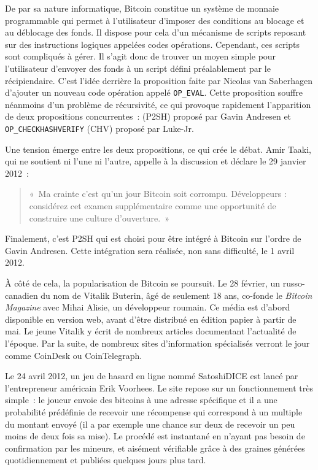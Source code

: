 De par sa nature informatique, Bitcoin constitue un système de monnaie programmable qui permet à l'utilisateur d'imposer des conditions au blocage et au déblocage des fonds. Il dispose pour cela d'un mécanisme de scripts reposant sur des instructions logiques appelées codes opérations. Cependant, ces scripts sont compliqués à gérer. Il s'agit donc de trouver un moyen simple pour l'utilisateur d'envoyer des fonds à un script défini préalablement par le récipiendaire. C'est l'idée derrière la proposition faite par Nicolas van Saberhagen d'ajouter un nouveau code opération appelé \verb?OP_EVAL?. Cette proposition souffre néanmoins d'un problème de récursivité, ce qui provoque rapidement l'apparition de deux propositions concurrentes~:  (P2SH) proposé par Gavin Andresen et \verb?OP_CHECKHASHVERIFY? (CHV) proposé par Luke-Jr.

Une tension émerge entre les deux propositions, ce qui crée le débat. Amir Taaki, qui ne soutient ni l'une ni l'autre, appelle à la discussion et déclare le 29 janvier 2012~:

\begin{quote}
«~Ma crainte c'est qu'un jour Bitcoin soit corrompu. Développeurs : considérez cet examen supplémentaire comme une opportunité de construire une culture d'ouverture.~»
\end{quote} 

Finalement, c'est P2SH qui est choisi pour être intégré à Bitcoin sur l'ordre de Gavin Andresen. Cette intégration sera réalisée, non sans difficulté, le 1\ier{} avril 2012.


À côté de cela, la popularisation de Bitcoin se poursuit. Le 28 février, un russo-canadien du nom de Vitalik Buterin, âgé de seulement 18 ans, co-fonde le \emph{Bitcoin Magazine} avec Mihai Alisie, un développeur roumain. Ce média est d'abord disponible en version web, avant d'être distribué en édition papier à partir de mai. Le jeune Vitalik y écrit de nombreux articles documentant l'actualité de l'époque. Par la suite, de nombreux sites d'information spécialisés verront le jour comme CoinDesk ou CoinTelegraph.

Le 24 avril 2012, un jeu de hasard en ligne nommé SatoshiDICE est lancé par l'entrepreneur américain Erik Voorhees. Le site repose sur un fonctionnement très simple~: le joueur envoie des bitcoins à une adresse spécifique et il a une probabilité prédéfinie de recevoir une récompense qui correspond à un multiple du montant envoyé (il a par exemple une chance sur deux de recevoir un peu moins de deux fois sa mise). Le procédé est instantané en n'ayant pas besoin de confirmation par les mineurs, et aisément vérifiable grâce à des graines générées quotidiennement et publiées quelques jours plus tard.

